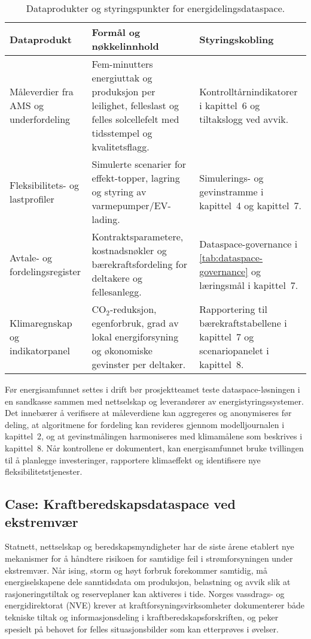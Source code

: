 \begin{table}[ht]
    \centering
    \caption{Dataprodukter og styringspunkter for energidelingsdataspace.}
    \label{tab:energideling-datakrav}
    \begin{tabular}{p{3.4cm}p{4.6cm}p{4.0cm}}
        \toprule
        \textbf{Dataprodukt} & \textbf{Formål og nøkkelinnhold} & \textbf{Styringskobling} \\
        \midrule
        Måleverdier fra AMS og underfordeling & Fem-minutters energiuttak og produksjon per leilighet, felleslast og felles solcellefelt med tidsstempel og kvalitetsflagg. & Kontrolltårnindikatorer i kapittel~6 og tiltakslogg ved avvik. \\
        \addlinespace
        Fleksibilitets- og lastprofiler & Simulerte scenarier for effekt-topper, lagring og styring av varmepumper/EV-lading. & Simulerings- og gevinstramme i kapittel~4 og kapittel~7. \\
        \addlinespace
        Avtale- og fordelingsregister & Kontraktsparametere, kostnadsnøkler og bærekraftsfordeling for deltakere og fellesanlegg. & Dataspace-governance i \autoref{tab:dataspace-governance} og læringsmål i kapittel~7. \\
        \addlinespace
        Klimaregnskap og indikatorpanel & CO$_2$-reduksjon, egenforbruk, grad av lokal energiforsyning og økonomiske gevinster per deltaker. & Rapportering til bærekraftstabellene i kapittel~7 og scenariopanelet i kapittel~8. \\
        \bottomrule
    \end{tabular}
\end{table}

Før energisamfunnet settes i drift bør prosjektteamet teste dataspace-løsningen i en sandkasse sammen med nettselskap og leverandører av energistyringssystemer. Det innebærer å verifisere at måleverdiene kan aggregeres og anonymiseres før deling, at algoritmene for fordeling kan revideres gjennom modelljournalen i kapittel~2, og at gevinstmålingen harmoniseres med klimamålene som beskrives i kapittel~8. Når kontrollene er dokumentert, kan energisamfunnet bruke tvillingen til å planlegge investeringer, rapportere klimaeffekt og identifisere nye fleksibilitetstjenester.

\subsection{Case: Kraftberedskapsdataspace ved ekstremvær}
Statnett, nettselskap og beredskapsmyndigheter har de siste årene etablert nye mekanismer for å håndtere risikoen for samtidige feil i strømforsyningen under ekstremvær.\citep{statnett2023vinter,dsb2022kraft} Når ising, storm og høyt forbruk forekommer samtidig, må energiselskapene dele sanntidsdata om produksjon, belastning og avvik slik at rasjoneringstiltak og reserveplaner kan aktiveres i tide. Norges vassdrags- og energidirektorat (NVE) krever at kraftforsyningsvirksomheter dokumenterer både tekniske tiltak og informasjonsdeling i kraftberedskapsforskriften, og peker spesielt på behovet for felles situasjonsbilder som kan etterprøves i øvelser.\citep{nve2023kraftberedskap}

